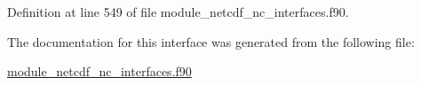 Definition at line 549 of file module\+\_\+netcdf\+\_\+nc\+\_\+interfaces.\+f90.



The documentation for this interface was generated from the following file\+:\begin{DoxyCompactItemize}
\item 
\hyperlink{module__netcdf__nc__interfaces_8f90}{module\+\_\+netcdf\+\_\+nc\+\_\+interfaces.\+f90}\end{DoxyCompactItemize}
